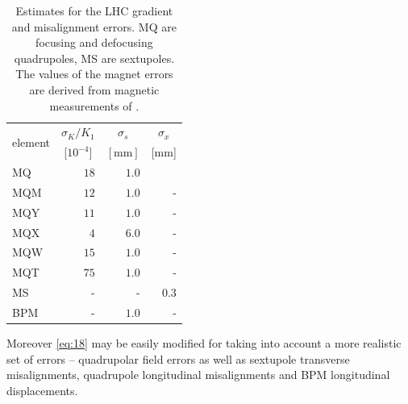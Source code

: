 \begin{table}
	\centering
	\begin{tabular}{lrrr}
		\multirow{ 2}{*}{element} & \multicolumn{1}{c}{ $ \sigma_K/K_1 $ }&\multicolumn{1}{c}{ $ \sigma_s $ }&\multicolumn{1}{c}{ $ \sigma_x $}\\
		&\multicolumn{1}{c}{  [$ 10^{-4} $]} &\multicolumn{1}{c}{  $ [\text{mm}] $} &\multicolumn{1}{c}{  [mm]} \rule[-3mm]{0mm}{0mm} \\ 
		\hline
		MQ & $18  $ & $ 1.0   $ &\rule[5mm]{0mm}{0mm}\\
		MQM & $ 12 $ & $ 1.0   $ & -\\
		MQY & $ 11 $ & $ 1.0  $ & -\\
		MQX &  $4   $ & $ 6.0   $  & -\\
		MQW & $ 15  $ & $ 1.0   $  & -\\
		MQT & $ 75  $ & $ 1.0   $  & -\\
		MS & -& - & $ 0.3   $ \\
		BPM & -& $ 1.0   $ & - 
	\end{tabular}
    \caption{Estimates for the LHC gradient and misalignment errors. MQ are focusing and defocusing
    quadrupoles, MS are sextupoles.
    The values of the magnet errors are derived from magnetic measurements of \cite{wise1, wise2}.
    }
	\label{tab:unc_estimates}
\end{table}

Moreover \eqref{eq:18} may be easily modified for taking into account a more realistic set of errors -- quadrupolar field errors as well as sextupole transverse misalignments, quadrupole longitudinal misalignments and BPM longitudinal displacements. 


